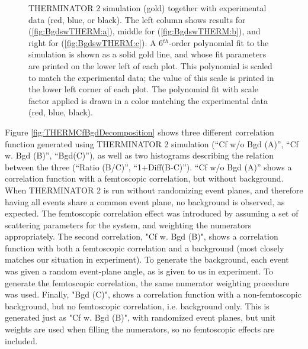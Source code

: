 \documentclass[/home/jesse/Analysis/FemtoAnalysis/AnalysisNotes/AnalysisNoteJBuxton.tex]{subfiles}
\begin{document}
\begin{figure}[h!]
  \caption[Backgrounds with THERMINATOR]{THERMINATOR 2 simulation (gold) together with experimental data (red, blue, or black).  The left column shows results for \LamKchP (\ref{fig:BgdswTHERM:a}), middle for \LamKchM (\ref{fig:BgdswTHERM:b}), and right for \LamKs (\ref{fig:BgdswTHERM:c}).  A 6$^{th}$-order polynomial fit to the simulation is shown as a solid gold line, and whose fit parameters are printed on the lower left of each plot.  This polynomial is scaled to match the experimental data; the value of this scale is printed in the lower left corner of each plot.  The polynomial fit with scale factor applied is drawn in a color matching the experimental data (red, blue, black).}
  \label{fig:BgdswTHERM}
\end{figure}


Figure \ref{fig:THERMCfBgdDecomposition} shows three different correlation function generated using THERMINATOR 2 simulation (``Cf w/o Bgd (A)'', ``Cf w. Bgd (B)'', ``Bgd(C)''), as well as two histograms describing the relation between the three (``Ratio (B/C)'', ``1+Diff(B-C)'').  
``Cf w/o Bgd (A)'' shows a correlation function with a femtoscopic correlation, but without background.  
When THERMINATOR 2 is run without randomizing event planes, and therefore having all events share a common event plane, no background is observed, as expected.  
The femtoscopic correlation effect was introduced by assuming a set of scattering parameters for the system, and weighting the numerators appropriately.  
The second correlation, "Cf w. Bgd (B)", shows a correlation function with both a femtoscopic correlation and a background (most closely matches our situation in experiment).  
To generate the background, each event was given a random event-plane angle, as is given to us in experiment.  
To generate the femtoscopic correlation, the same numerator weighting procedure was used.  
Finally, "Bgd (C)", shows a correlation function with a non-femtoscopic background, but no femtoscopic correlation, i.e. background only.  
This is generated just as "Cf w. Bgd (B)", with randomized event planes, but unit weights are used when filling the numerators, so no femtoscopic effects are included.
\end{document}
